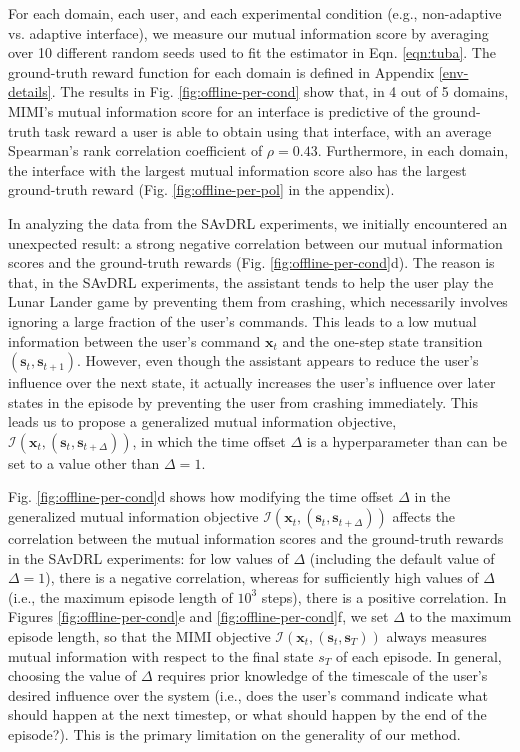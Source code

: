 \documentclass{article}
\newcommand{\bx}{\mathbf{x}}
\newcommand{\bs}{\mathbf{s}}
\newcommand{\mi}{\mathcal{I}}
\begin{document}
For each domain, each user, and each experimental condition (e.g., non-adaptive vs. adaptive interface), we measure our mutual information score by averaging over 10 different random seeds used to fit the estimator in Eqn. \ref{eqn:tuba}.
The ground-truth reward function for each domain is defined in Appendix \ref{env-details}.
The results in Fig. \ref{fig:offline-per-cond} show that, in 4 out of 5 domains, MIMI's mutual information score for an interface is predictive of the ground-truth task reward a user is able to obtain using that interface, with an average Spearman's rank correlation coefficient of $\rho = 0.43$.
Furthermore, in each domain, the interface with the largest mutual information score also has the largest ground-truth reward (Fig. \ref{fig:offline-per-pol} in the appendix).

In analyzing the data from the SAvDRL experiments, we initially encountered an unexpected result: a strong negative correlation between our mutual information scores and the ground-truth rewards (Fig. \ref{fig:offline-per-cond}d). 
The reason is that, in the SAvDRL experiments, the assistant tends to help the user play the Lunar Lander game by preventing them from crashing, which necessarily involves ignoring a large fraction of the user's commands.
This leads to a low mutual information between the user's command $\bx_t$ and the one-step state transition $(\bs_t, \bs_{t+1})$.
However, even though the assistant appears to reduce the user's influence over the next state, it actually increases the user's influence over later states in the episode by preventing the user from crashing immediately.
This leads us to propose a generalized mutual information objective, $\mi(\bx_t, (\bs_t, \bs_{t+\Delta}))$, in which the time offset $\Delta$ is a hyperparameter than can be set to a value other than $\Delta = 1$.

Fig. \ref{fig:offline-per-cond}d shows how modifying the time offset $\Delta$ in the generalized mutual information objective $\mi(\bx_t, (\bs_t, \bs_{t+\Delta}))$ affects the correlation between the mutual information scores and the ground-truth rewards in the SAvDRL experiments: for low values of $\Delta$ (including the default value of $\Delta = 1$), there is a negative correlation, whereas for sufficiently high values of $\Delta$ (i.e., the maximum episode length of $10^3$ steps), there is a positive correlation.
In Figures \ref{fig:offline-per-cond}e and \ref{fig:offline-per-cond}f, we set $\Delta$ to the maximum episode length, so that the MIMI objective $\mi(\bx_t, (\bs_t, \bs_T))$ always measures mutual information with respect to the final state $s_T$ of each episode.
In general, choosing the value of $\Delta$ requires prior knowledge of the timescale of the user's desired influence over the system (i.e., does the user's command indicate what should happen at the next timestep, or what should happen by the end of the episode?).
This is the primary limitation on the generality of our method.
\end{document}

